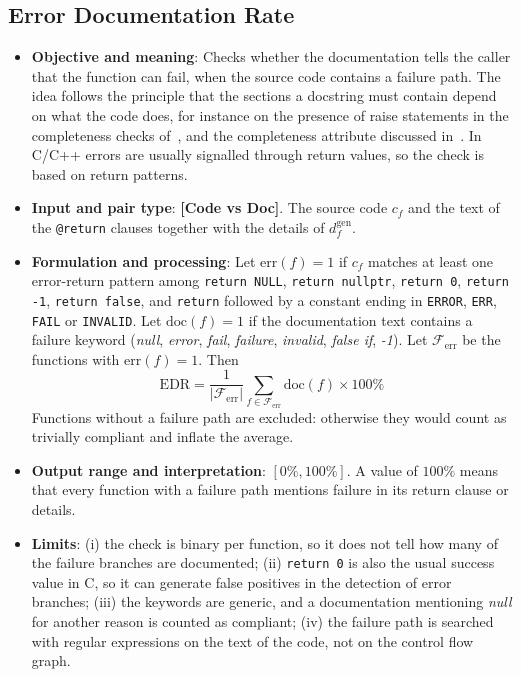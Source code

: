 \subsection{Error Documentation Rate}
\label{sec:m-edr}
\begin{itemize}[leftmargin=*, label=\textbullet]
	\item \textbf{Objective and meaning}: Checks whether the documentation tells the caller that the
	function can fail, when the source code contains a failure path. The idea follows the principle
	that the sections a docstring must contain depend on what the code does, for instance on the
	presence of raise statements in the completeness checks of~\cite{yang_docagent_2025}, and the
	completeness attribute discussed in~\cite{rai_review_2022}. In C/C++ errors are usually signalled
	through return values, so the check is based on return patterns.

	\item \textbf{Input and pair type}: \textbf{[Code vs Doc]}. The source code $c_f$ and the text of
	the \texttt{@return} clauses together with the details of $d_f^{\mathrm{gen}}$.

	\item \textbf{Formulation and processing}: Let $\mathrm{err}(f)=1$ if $c_f$ matches at least one
	error-return pattern among \texttt{return NULL}, \texttt{return nullptr}, \texttt{return 0},
	\texttt{return -1}, \texttt{return false}, and \texttt{return} followed by a constant ending in
	\texttt{ERROR}, \texttt{ERR}, \texttt{FAIL} or \texttt{INVALID}. Let $\mathrm{doc}(f)=1$ if the
	documentation text contains a failure keyword (\emph{null}, \emph{error}, \emph{fail},
	\emph{failure}, \emph{invalid}, \emph{false if}, \emph{-1}). Let $\mathcal{F}_{\mathrm{err}}$ be the
	functions with $\mathrm{err}(f)=1$. Then
	\begin{equation}
		\mathrm{EDR} = \frac{1}{|\mathcal{F}_{\mathrm{err}}|}
		\sum_{f\in\mathcal{F}_{\mathrm{err}}} \mathrm{doc}(f)\times 100\%
		\label{eq:edr}
	\end{equation}
	Functions without a failure path are excluded: otherwise they would count as trivially
	compliant and inflate the average.

	\item \textbf{Output range and interpretation}: $[0\%,100\%]$. A value of $100\%$ means that every
	function with a failure path mentions failure in its return clause or details.

	\item \textbf{Limits}: (i) the check is binary per function, so it does not tell how many of the
	failure branches are documented; (ii) \texttt{return 0} is also the usual success value in C, so
	it can generate false positives in the detection of error branches; (iii) the keywords are
	generic, and a documentation mentioning \emph{null} for another reason is counted as compliant;
	(iv) the failure path is searched with regular expressions on the text of the code, not on the
	control flow graph.
\end{itemize}

